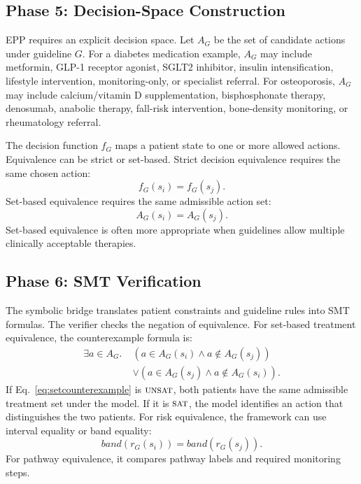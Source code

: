 \documentclass[english,5p,twocolumn,preprint]{elsarticle}
\newcommand{\sat}{\textsc{sat}}
\newcommand{\unsat}{\textsc{unsat}}
\begin{document}
\subsection{Phase 5: Decision-Space Construction}
EPP requires an explicit decision space. Let $A_G$ be the set of candidate actions under guideline $G$. For a diabetes medication example, $A_G$ may include metformin, GLP-1 receptor agonist, SGLT2 inhibitor, insulin intensification, lifestyle intervention, monitoring-only, or specialist referral. For osteoporosis, $A_G$ may include calcium/vitamin D supplementation, bisphosphonate therapy, denosumab, anabolic therapy, fall-risk intervention, bone-density monitoring, or rheumatology referral. 

The decision function $f_G$ maps a patient state to one or more allowed actions. Equivalence can be strict or set-based. Strict decision equivalence requires the same chosen action:
\begin{equation}
    f_G(s_i) = f_G(s_j).
\end{equation}
Set-based equivalence requires the same admissible action set:
\begin{equation}
    A_G(s_i) = A_G(s_j).
\end{equation}
Set-based equivalence is often more appropriate when guidelines allow multiple clinically acceptable therapies.

\subsection{Phase 6: SMT Verification}
The symbolic bridge translates patient constraints and guideline rules into SMT formulas. The verifier checks the negation of equivalence. For set-based treatment equivalence, the counterexample formula is:
\begin{equation}
\label{eq:setcounterexample}
\begin{split}
    \exists a \in A_G.\;& \left(a \in A_G(s_i) \land a \notin A_G(s_j)\right)\\
    &\lor \left(a \in A_G(s_j) \land a \notin A_G(s_i)\right).
\end{split}
\end{equation}
If Eq.~\eqref{eq:setcounterexample} is $\unsat$, both patients have the same admissible treatment set under the model. If it is $\sat$, the model identifies an action that distinguishes the two patients. For risk equivalence, the framework can use interval equality or band equality:
\begin{equation}
    band(r_G(s_i)) = band(r_G(s_j)).
\end{equation}
For pathway equivalence, it compares pathway labels and required monitoring steps.
\end{document}
